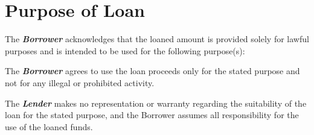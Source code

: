 
\section{Purpose of Loan}
\label{sec:loanpurpose}

The \textbf{\textit{Borrower}} acknowledges that the loaned amount is provided solely for lawful purposes and is intended to be used for the following purpose(s):

\vspace{0.3cm}

\noindent \LoanPurpose{}

\vspace{0.3cm}

\noindent The \textbf{\textit{Borrower}} agrees to use the loan proceeds only for the stated purpose and not for any illegal or prohibited activity. 

\vspace{0.3cm}

\noindent The \textbf{\textit{Lender}} makes no representation or warranty regarding the suitability of the loan for the stated purpose, and the Borrower assumes all responsibility for the use of the loaned funds.

